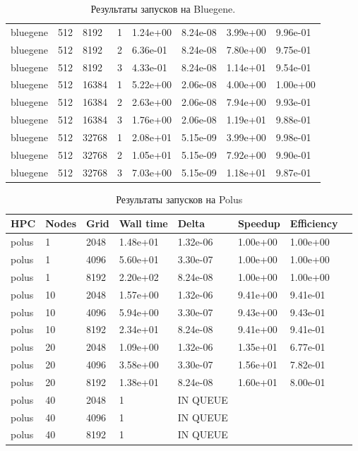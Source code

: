 \documentclass[12pt,a4paper]{scrartcl}
\begin{document}
\begin{center}
\begin{table}[h]
\begin{tabular}{l|lllllll}
bluegene & 512 & 8192 & 1 & 1.24e+00 & 8.24e-08 & 3.99e+00 & 9.96e-01 \\
bluegene & 512 & 8192 & 2 & 6.36e-01 & 8.24e-08 & 7.80e+00 & 9.75e-01 \\
bluegene & 512 & 8192 & 3 & 4.33e-01 & 8.24e-08 & 1.14e+01 & 9.54e-01 \\
bluegene & 512 & 16384 & 1 & 5.22e+00 & 2.06e-08 & 4.00e+00 & 1.00e+00 \\
bluegene & 512 & 16384 & 2 & 2.63e+00 & 2.06e-08 & 7.94e+00 & 9.93e-01 \\
bluegene & 512 & 16384 & 3 & 1.76e+00 & 2.06e-08 & 1.19e+01 & 9.88e-01 \\
bluegene & 512 & 32768 & 1 & 2.08e+01 & 5.15e-09 & 3.99e+00 & 9.98e-01 \\
bluegene & 512 & 32768 & 2 & 1.05e+01 & 5.15e-09 & 7.92e+00 & 9.90e-01 \\
bluegene & 512 & 32768 & 3 & 7.03e+00 & 5.15e-09 & 1.18e+01 & 9.87e-01 \\
\hline
\end{tabular}
\caption{Результаты запусков на Bluegene.}
\end{table}
\end{center}

\newpage
      
\begin{center}
\begin{table}[h]
\begin{tabular}{l|lllllll}
\label{tabular:polus}
HPC & Nodes & Grid & Wall time & Delta & Speedup & Efficiency \\
\hline
polus & 1 & 2048 & 1.48e+01 & 1.32e-06 & 1.00e+00 & 1.00e+00 \\
polus & 1 & 4096 & 5.60e+01 & 3.30e-07 & 1.00e+00 & 1.00e+00 \\
polus & 1 & 8192 & 2.20e+02 & 8.24e-08 & 1.00e+00 & 1.00e+00 \\
polus & 10 & 2048 & 1.57e+00 & 1.32e-06 & 9.41e+00 & 9.41e-01 \\
polus & 10 & 4096 & 5.94e+00 & 3.30e-07 & 9.43e+00 & 9.43e-01 \\
polus & 10 & 8192 & 2.34e+01 & 8.24e-08 & 9.41e+00 & 9.41e-01 \\
polus & 20 & 2048 & 1.09e+00 & 1.32e-06 & 1.35e+01 & 6.77e-01 \\
polus & 20 & 4096 & 3.58e+00 & 3.30e-07 & 1.56e+01 & 7.82e-01 \\
polus & 20 & 8192 & 1.38e+01 & 8.24e-08 & 1.60e+01 & 8.00e-01 \\
polus & 40 & 2048 & 1 & IN QUEUE \\
polus & 40 & 4096 & 1 & IN QUEUE \\
polus & 40 & 8192 & 1 & IN QUEUE \\
\hline

\end{tabular}
\caption{Результаты запусков на Polus}
\end{table}
\end{center}
\end{document}
